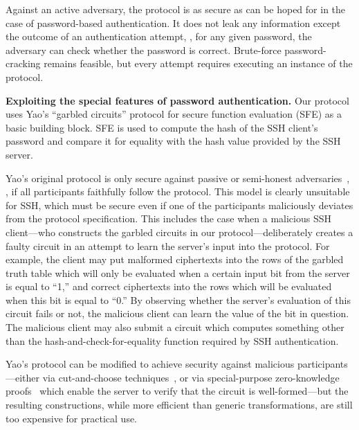 \begin{description}
Against an active adversary, the protocol is as secure as can be hoped
for in the case of password-based authentication.  It does not leak
any information except the outcome of an authentication attempt, \ie,
for any given password, the adversary can check whether the password
is correct.  Brute-force password-cracking remains feasible, but every
attempt requires executing an instance of the protocol.

\end{description}



\vspace{1ex}
\noindent
\textbf{Exploiting the special features of password authentication.}  
Our protocol uses Yao's ``garbled circuits'' protocol for secure function
evaluation (SFE) as a basic building block.  SFE is used to compute the
hash of the SSH client's password and compare it for equality with the
hash value provided by the SSH server.

Yao's original protocol is only secure against passive or semi-honest
adversaries~\cite{lindellpinkas-jcs,Yao86}, \ie, if all participants
faithfully follow the protocol.  This model is clearly unsuitable for
SSH, which must be secure even if one of the participants maliciously
deviates from the protocol specification.  This includes the case when
a malicious SSH client---who constructs the garbled circuits in our
protocol---deliberately creates a faulty circuit in an attempt to learn
the server's input into the protocol.  For example, the client may put
malformed ciphertexts into the rows of the garbled truth table which will
only be evaluated when a certain input bit from the server is equal to
``1,'' and correct ciphertexts into the rows which will be evaluated when
this bit is equal to ``0.''  By observing whether the server's evaluation
of this circuit fails or not, the malicious client can learn the value
of the bit in question.  The malicious client may also submit a circuit
which computes something other than the hash-and-check-for-equality
function required by SSH authentication.

Yao's protocol can be modified to achieve security
against malicious parti\-cipants---either via cut-and-choose
techniques~\cite{lindellpinkas-eurocrypt07,woodruff-eurocrypt07}, or via
special-purpose zero-knowledge proofs~\cite{jareckishmatikov-eurocrypt07}
which enable the server to verify that the circuit is well-formed---but
the resulting constructions, while more efficient than generic
transformations, are still too expensive for practical use.

